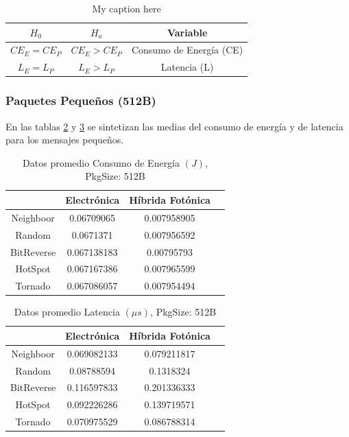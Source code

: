 \begin{table}[H]
\centering
\begin{tabular}{|c|c|c|}
\hline
$H_0$ & $H_a$ & Variable\\ 
\hline
$CE_E = CE_P$ & $CE_E > CE_P$ & Consumo de Energía (CE) \\
\hline
$L_E = L_P$ & $L_E > L_P$ & Latencia (L) \\
\hline
\end{tabular}
\caption{My caption here}
\label{tb:h0ha}
\end{table} 

\subsubsection{Paquetes Pequeños (512B)}

En las tablas \ref{tb:eall512} y \ref{tb:lall512} se sintetizan 
las medias del consumo de energía y de
latencia para los mensajes pequeños.

\begin{table}[H]
\centering
\begin{tabular}{|c|c|c|c|}
\hline
&Electrónica&Híbrida Fotónica\\
\hline
Neighboor&0.06709065&0.007958905\\
Random&0.0671371&0.007956592\\
BitReverse&0.067138183&0.00795793\\
HotSpot&0.067167386&0.007965599\\
Tornado&0.067086057&0.007954494\\
\hline
\end{tabular}
\caption{Datos promedio Consumo de Energía $(J)$, PkgSize: 512B}
\label{tb:eall512}
\end{table}


\begin{table}[H]
\centering
\begin{tabular}{|c|c|c|c|}
\hline
&Electrónica&Híbrida Fotónica\\
\hline
Neighboor&0.069082133&0.079211817\\
Random&0.08788594&0.1318324\\
BitReverse&0.116597833&0.201336333\\
HotSpot&0.092226286&0.139719571\\
Tornado&0.070975529&0.086788314\\
\hline
\end{tabular}
\caption{Datos promedio Latencia $(\mu s)$, PkgSize: 512B}
\label{tb:lall512}
\end{table}

